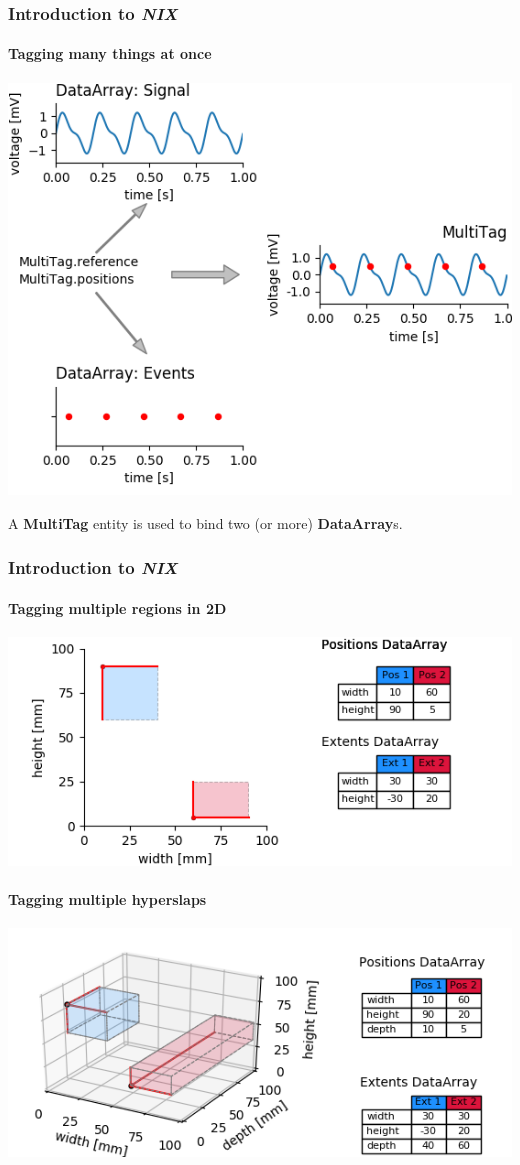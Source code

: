 \documentclass[pdftex, xcolor=table]{beamer}
\newcommand{\nix}{\textit{NIX}}
\newcommand{\dataarray}{\textbf{DataArray}}
\begin{document}
\begin{frame}
  \frametitle{Introduction to \nix{}}
  \framesubtitle{Tagging many things at once}
  \begin{center}
    \includegraphics[width=0.775\columnwidth]{images/mtag_concept.png}
  \end{center}
  \pause

  A \textbf{MultiTag} entity is used to bind two (or more)
  \dataarray{}s.
\end{frame}

\begin{frame}
  \frametitle{Introduction to \nix{}}
   {
    \framesubtitle{Tagging multiple regions in 2D}
    \begin{center}
      \includegraphics[width=0.85\columnwidth]{images/2d_mtag.png}
    \end{center}
  }
   {
    \framesubtitle{Tagging multiple hyperslaps}
    \begin{center}
      \includegraphics[width=0.85\columnwidth]{images/3d_mtag.png}
    \end{center}
  }
\end{frame}
\end{document}
